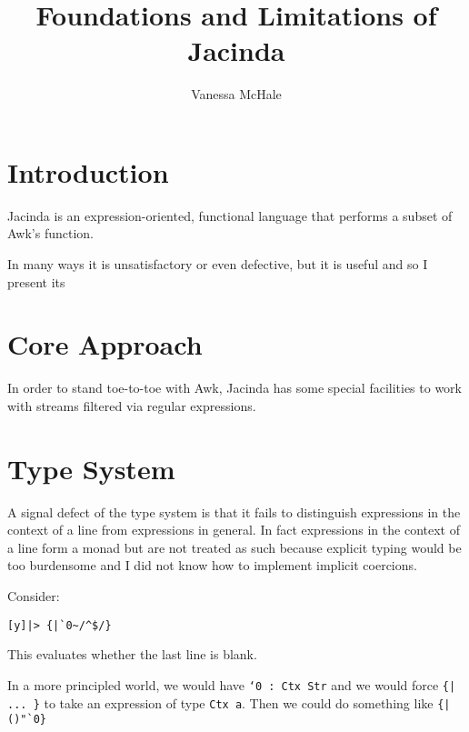 \documentclass{report}
\begin{document}
\title{Foundations and Limitations of Jacinda}
\author {Vanessa McHale}
\maketitle

\tableofcontents

\section{Introduction}

Jacinda is an expression-oriented, functional language that performs a subset of Awk's function.

In many ways it is unsatisfactory or even defective, but it is useful and so I present its

\section{Core Approach}

In order to stand toe-to-toe with Awk, Jacinda has some special facilities to work with streams filtered via regular expressions.

\section{Type System}

A signal defect of the type system is that it fails to distinguish expressions in the context of a line from expressions in general. In fact expressions in the context of a line form a monad but are not treated as such because explicit typing would be too burdensome and I did not know how to implement implicit coercions.

Consider:

\begin{verbatim}
[y]|> {|`0~/^$/}
\end{verbatim}

This evaluates whether the last line is blank.

In a more principled world, we would have {\tt `0 : Ctx Str} and we would force {\tt \{| ... \}} to take an expression of type {\tt Ctx a}. Then we could do something like {\tt \{|()"`0\}}
\end{document}
